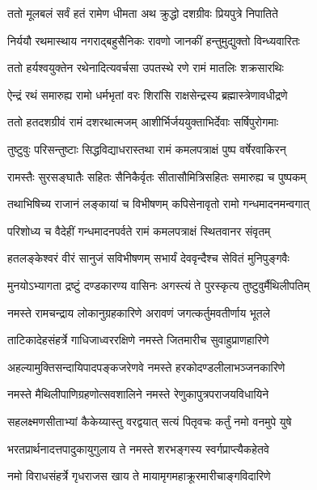\twolineshloka
{ततो मूलबलं सर्वं हतं रामेण धीमता}
{अथ क्रुद्धो दशग्रीवः प्रियपुत्रे निपातिते}%

\twolineshloka
{निर्ययौ रथमास्थाय नगराद्बहुसैनिकः}
{रावणो जानकीं हन्तुमुद्युक्तो विन्ध्यवारितः}%

\twolineshloka
{ततो हर्यश्वयुक्तेन रथेनादित्यवर्चसा}
{उपतस्थे रणे रामं मातलिः शक्रसारथिः}%

\twolineshloka
{ऐन्द्रं रथं समारुह्य रामो धर्मभृतां वरः}
{शिरांसि राक्षसेन्द्रस्य ब्रह्मास्त्रेणावधीद्रणे}%

\twolineshloka
{ततो हतदशग्रीवं रामं दशरथात्मजम्}
{आशीर्भिर्जययुक्ताभिर्देवाः सर्षिपुरोगमाः}%

\twolineshloka
{तुष्टुवुः परिसन्तुष्टाः सिद्धविद्याधरास्तथा}
{रामं कमलपत्राक्षं पुष्प वर्षेरवाकिरन्}%

\twolineshloka
{रामस्तैः सुरसङ्घातैः सहितः सैनिकैर्वृतः}
{सीतासौमित्रिसहितः समारुह्य च पुष्पकम्}%

\twolineshloka
{तथाभिषिच्य राजानं लङ्कायां च विभीषणम्}
{कपिसेनावृतो रामो गन्धमादनमन्वगात्}%

\twolineshloka
{परिशोध्य च वैदेहीं गन्धमादनपर्वते}
{रामं कमलपत्राक्षं स्थितवानर संवृतम्}%

\twolineshloka
{हतलङ्केश्वरं वीरं सानुजं सविभीषणम्}
{सभार्यं देववृन्दैश्च सेवितं मुनिपुङ्गवैः}%

\twolineshloka
{मुनयोऽभ्यागता द्रष्टुं दण्डकारण्य वासिनः}
{अगस्त्यं ते पुरस्कृत्य तुष्टुवुर्मैथिलीपतिम्}%


\twolineshloka
{नमस्ते रामचन्द्राय लोकानुग्रहकारिणे}
{अरावणं जगत्कर्तुमवतीर्णाय भूतले}%

\twolineshloka
{ताटिकादेहसंहर्त्रे गाधिजाध्वररक्षिणे}
{नमस्ते जितमारीच सुवाहुप्राणहारिणे}%

\twolineshloka
{अहल्यामुक्तिसन्दायिपादपङ्कजरेणवे}
{नमस्ते हरकोदण्डलीलाभञ्जनकारिणे}%

\twolineshloka
{नमस्ते मैथिलीपाणिग्रहणोत्सवशालिने}
{नमस्ते रेणुकापुत्रपराजयविधायिने}%

\twolineshloka
{सहलक्ष्मणसीताभ्यां कैकेय्यास्तु वरद्वयात्}
{सत्यं पितृवचः कर्तुं नमो वनमुपे युषे}%

\twolineshloka
{भरतप्रार्थनादत्तपादुकायुगुलाय ते}
{नमस्ते शरभङ्गस्य स्वर्गप्राप्त्यैकहेतवे}%

\twolineshloka
{नमो विराधसंहर्त्रे गृधराजस खाय ते}
{मायामृगमहाक्रूरमारीचाङ्गविदारिणे}%

